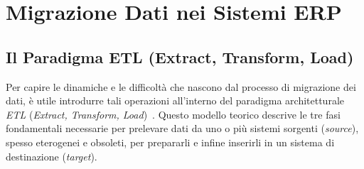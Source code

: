 \section{Migrazione Dati nei Sistemi ERP}\label{sec:migrazione-dati-nei-sistemi-erp}

\subsection{Il Paradigma ETL (Extract, Transform, Load)}\label{subsec:il-paradigma-etl-(extract-transform-load)}
Per capire le dinamiche e le difficoltà che nascono dal processo di migrazione dei dati, è utile introdurre tali operazioni all'interno del paradigma
architetturale \textit{ETL} (\textit{Extract, Transform, Load})~\cite{kimballETL}.
Questo modello teorico descrive le tre fasi fondamentali necessarie per prelevare dati da uno o
più sistemi sorgenti (\textit{source}), spesso eterogenei e obsoleti, per prepararli e infine inserirli in un sistema di destinazione (\textit{target}).

